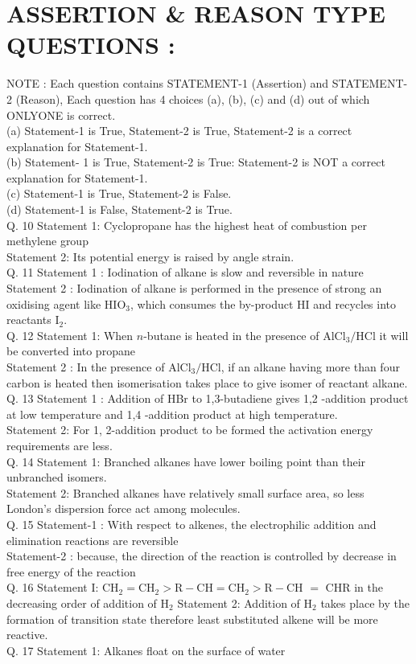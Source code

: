 \documentclass[10pt]{article}
\begin{document}
\section*{ASSERTION \& REASON TYPE QUESTIONS :}
NOTE : Each question contains STATEMENT-1 (Assertion) and STATEMENT-2 (Reason), Each question has 4 choices (a), (b), (c) and (d) out of which ONLYONE is correct.\\
(a) Statement-1 is True, Statement-2 is True, Statement-2 is a correct explanation for Statement-1.\\
(b) Statement- 1 is True, Statement-2 is True: Statement-2 is NOT a correct explanation for Statement-1.\\
(c) Statement-1 is True, Statement-2 is False.\\
(d) Statement-1 is False, Statement-2 is True.\\
Q. 10 Statement 1: Cyclopropane has the highest heat of combustion per methylene group\\
Statement 2: Its potential energy is raised by angle strain.\\
Q. 11 Statement 1 : Iodination of alkane is slow and reversible in nature\\
Statement 2 : Iodination of alkane is performed in the presence of strong an oxidising agent like $\mathrm{HIO}_{3}$, which consumes the by-product HI and recycles into reactants $\mathrm{I}_{2}$.\\
Q. 12 Statement 1: When $n$-butane is heated in the presence of $\mathrm{AlCl}_{3} / \mathrm{HCl}$ it will be converted into propane\\
Statement 2 : In the presence of $\mathrm{AlCl}_{3} / \mathrm{HCl}$, if an alkane having more than four carbon is heated then isomerisation takes place to give isomer of reactant alkane.\\
Q. 13 Statement 1 : Addition of HBr to 1,3-butadiene gives 1,2 -addition product at low temperature and 1,4 -addition product at high temperature.\\
Statement 2: For 1, 2-addition product to be formed the activation energy requirements are less.\\
Q. 14 Statement 1: Branched alkanes have lower boiling point than their unbranched isomers.\\
Statement 2: Branched alkanes have relatively small surface area, so less London's dispersion force act among molecules.\\
Q. 15 Statement-1 : With respect to alkenes, the electrophilic addition and elimination reactions are reversible\\
Statement-2 : because, the direction of the reaction is controlled by decrease in free energy of the reaction\\
Q. 16 Statement I: $\mathrm{CH}_{2}=\mathrm{CH}_{2}>\mathrm{R}-\mathrm{CH}=\mathrm{CH}_{2}>\mathrm{R}-\mathrm{CH}$ $=$ CHR in the decreasing order of addition of $\mathrm{H}_{2}$ Statement 2: Addition of $\mathrm{H}_{2}$ takes place by the formation of transition state therefore least substituted alkene will be more reactive.\\
Q. 17 Statement 1: Alkanes float on the surface of water
\end{document}

